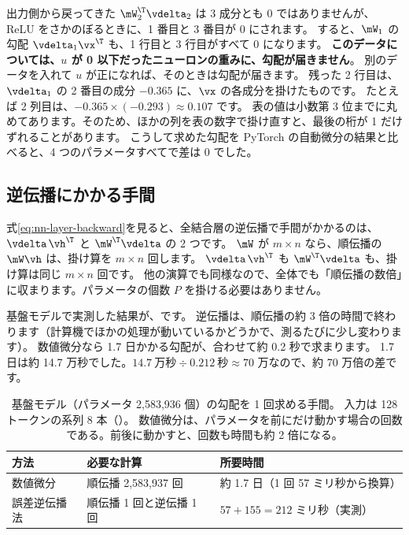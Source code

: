 出力側から戻ってきた $\mW_2^\T\vdelta_2$ は 3 成分とも 0 ではありませんが、ReLU をさかのぼるときに、1 番目と 3 番目が 0 にされます。
すると、$\mW_1$ の勾配 $\vdelta_1\vx^\T$ も、1 行目と 3 行目がすべて 0 になります。
\textbf{このデータについては、$u$ が 0 以下だったニューロンの重みに、勾配が届きません}。
別のデータを入れて $u$ が正になれば、そのときは勾配が届きます。
残った 2 行目は、$\vdelta_1$ の 2 番目の成分 $-0.365$ に、$\vx$ の各成分を掛けたものです。
たとえば 2 列目は、$-0.365\times(-0.293)\approx 0.107$ です。
表の値は小数第 3 位までに丸めてあります。そのため、ほかの列を表の数字で掛け直すと、最後の桁が 1 だけずれることがあります。
こうして求めた勾配を PyTorch の自動微分の結果と比べると、4 つのパラメータすべてで差は 0 でした。

\subsection*{逆伝播にかかる手間}

式\eqref{eq:nn-layer-backward}を見ると、全結合層の逆伝播で手間がかかるのは、$\vdelta\,\vh^\T$ と $\mW^\T\vdelta$ の 2 つです。
$\mW$ が $m\times n$ なら、順伝播の $\mW\vh$ は、掛け算を $m\times n$ 回します。
$\vdelta\,\vh^\T$ も $\mW^\T\vdelta$ も、掛け算は同じ $m\times n$ 回です。
他の演算でも同様なので、全体でも「順伝播の数倍」に収まります。パラメータの個数 $P$ を掛ける必要はありません。

基盤モデルで実測した結果が、です。
逆伝播は、順伝播の約 3 倍の時間で終わります（計算機でほかの処理が動いているかどうかで、測るたびに少し変わります）。
数値微分なら 1.7 日かかる勾配が、合わせて約 0.2 秒で求まります。
1.7 日は約 14.7 万秒でした。$14.7\ \text{万秒}\div 0.212\ \text{秒}\approx 70$ 万なので、約 70 万倍の差です。

\begin{table}[tbp]
\centering
\caption{基盤モデル（パラメータ 2,583,936 個）の勾配を 1 回求める手間。
入力は 128 トークンの系列 8 本（）。
数値微分は、パラメータを前にだけ動かす場合の回数である。前後に動かすと、回数も時間も約 2 倍になる。}
\label{tab:nn-cost}
\small
\begin{tabular}{lll}
\toprule
方法 & 必要な計算 & 所要時間 \\
\midrule
数値微分 & 順伝播 2,583,937 回 & 約 1.7 日（1 回 57 ミリ秒から換算） \\
誤差逆伝播法 & 順伝播 1 回と逆伝播 1 回 & $57+155=212$ ミリ秒（実測） \\
\bottomrule
\end{tabular}
\end{table}

